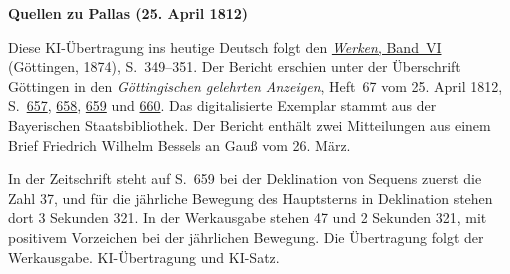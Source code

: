 \clearpage\thispagestyle{empty}
\begin{center}\textbf{Quellen zu Pallas (25. April 1812)}\end{center}
\noindent Diese KI-Übertragung ins heutige Deutsch folgt den \href{https://gdz.sub.uni-goettingen.de/id/PPN236007467}{\textit{Werken}, Band~VI} (Göttingen, 1874), S.~349--351. Der Bericht erschien unter der Überschrift Göttingen in den \textit{Göttingischen gelehrten Anzeigen}, Heft~67 vom 25. April 1812, S.~\href{https://api.digitale-sammlungen.de/iiif/image/v2/bsb10538681_00701/full/1600,/0/default.jpg}{657}, \href{https://api.digitale-sammlungen.de/iiif/image/v2/bsb10538681_00702/full/1600,/0/default.jpg}{658}, \href{https://api.digitale-sammlungen.de/iiif/image/v2/bsb10538681_00703/full/1600,/0/default.jpg}{659} und \href{https://api.digitale-sammlungen.de/iiif/image/v2/bsb10538681_00704/full/1600,/0/default.jpg}{660}. Das digitalisierte Exemplar stammt aus der Bayerischen Staatsbibliothek. Der Bericht enthält zwei Mitteilungen aus einem Brief Friedrich Wilhelm Bessels an Gauß vom 26. März.
\par\smallskip\noindent In der Zeitschrift steht auf S.~659 bei der Deklination von Sequens zuerst die Zahl 37, und für die jährliche Bewegung des Hauptsterns in Deklination stehen dort 3 Sekunden 321. In der Werkausgabe stehen 47 und 2 Sekunden 321, mit positivem Vorzeichen bei der jährlichen Bewegung. Die Übertragung folgt der Werkausgabe. KI-Übertragung und KI-Satz.
\clearpage

